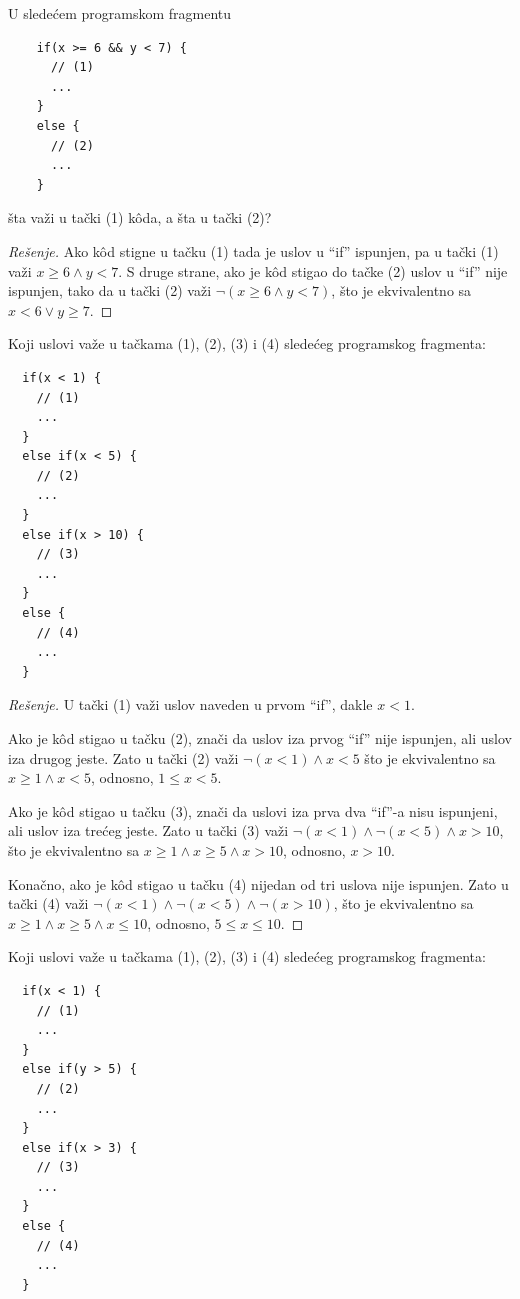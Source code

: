 \begin{EX}
  U slede\'cem programskom fragmentu
{\small
\begin{verbatim}
    if(x >= 6 && y < 7) {
      // (1)
      ...
    }
    else {
      // (2)
      ...
    }
\end{verbatim}
}
\end{EX}
\noindent
\v sta va\v zi u ta\v cki (1) k\^oda, a \v sta u ta\v cki (2)?
\begin{proof}[Re\v senje]
  Ako k\^od stigne u ta\v cku (1) tada je uslov u \enquote{if} ispunjen, pa u ta\v cki (1) va\v zi
  $x \ge 6 \land y < 7$.
  S druge strane, ako je k\^od stigao do ta\v cke (2) uslov u \enquote{if} nije ispunjen, tako da u ta\v cki (2) va\v zi
  $\lnot(x \ge 6 \land y < 7)$,
  \v sto je ekvivalentno sa $x < 6 \lor y \ge 7$.
\end{proof}

\begin{EX}
  Koji uslovi va\v ze u ta\v ckama (1), (2), (3) i (4) slede\'ceg programskog fragmenta:
{\small
\begin{verbatim}
  if(x < 1) {
    // (1)
    ...
  }
  else if(x < 5) {
    // (2)
    ...
  }
  else if(x > 10) {
    // (3)
    ...
  }
  else {
    // (4)
    ...
  }
\end{verbatim}
}
\end{EX}
\begin{proof}[Re\v senje]
  U ta\v cki (1) va\v zi uslov naveden u prvom \enquote{if}, dakle $x < 1$.
  
  Ako je k\^od stigao u ta\v cku (2), zna\v ci da uslov
  iza prvog \enquote{if} nije ispunjen, ali uslov iza drugog jeste. Zato u ta\v cki (2) va\v zi
  $\lnot(x < 1) \land x < 5$ \v sto je ekvivalentno sa $x \ge 1 \land x < 5$,
  odnosno, $1 \le x < 5$.

  Ako je k\^od stigao u ta\v cku (3), zna\v ci da uslovi
  iza prva dva \enquote{if}-a nisu ispunjeni, ali uslov iza tre\'ceg jeste. Zato u ta\v cki (3) va\v zi
  $\lnot(x < 1) \land \lnot(x < 5) \land x > 10$, \v sto je ekvivalentno sa
  $x \ge 1 \land x \ge 5 \land x > 10$, odnosno, $x > 10$.
  
  Kona\v cno, ako je k\^od stigao u ta\v cku (4) nijedan od tri uslova nije ispunjen. Zato u ta\v cki (4)
  va\v zi $\lnot(x < 1) \land \lnot(x < 5) \land \lnot(x > 10)$, \v sto je ekvivalentno sa
  $x \ge 1 \land x \ge 5 \land x \le 10$, odnosno, $5 \le x \le 10$.
\end{proof}

\begin{EX}
  Koji uslovi va\v ze u ta\v ckama (1), (2), (3) i (4) slede\'ceg programskog fragmenta:
{\small
\begin{verbatim}
  if(x < 1) {
    // (1)
    ...
  }
  else if(y > 5) {
    // (2)
    ...
  }
  else if(x > 3) {
    // (3)
    ...
  }
  else {
    // (4)
    ...
  }
\end{verbatim}
}
\end{EX}

